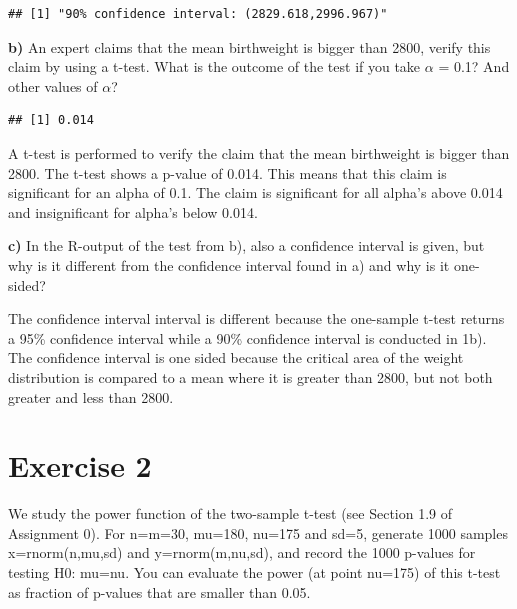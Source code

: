 \documentclass[
]{article}
\newenvironment{Shaded}{\begin{snugshade}}{\end{snugshade}}
\newcommand{\AttributeTok}[1]{\textcolor[rgb]{0.77,0.63,0.00}{#1}}
\newcommand{\DecValTok}[1]{\textcolor[rgb]{0.00,0.00,0.81}{#1}}
\newcommand{\FloatTok}[1]{\textcolor[rgb]{0.00,0.00,0.81}{#1}}
\newcommand{\FunctionTok}[1]{\textcolor[rgb]{0.00,0.00,0.00}{#1}}
\newcommand{\NormalTok}[1]{#1}
\newcommand{\SpecialCharTok}[1]{\textcolor[rgb]{0.00,0.00,0.00}{#1}}
\newcommand{\StringTok}[1]{\textcolor[rgb]{0.31,0.60,0.02}{#1}}
\begin{document}
\begin{verbatim}
## [1] "90% confidence interval: (2829.618,2996.967)"
\end{verbatim}

\textbf{b)} An expert claims that the mean birthweight is bigger than
2800, verify this claim by using a t-test. What is the outcome of the
test if you take \(\alpha\) = 0.1? And other values of \(\alpha\)?

\begin{Shaded}
\end{Shaded}

\begin{verbatim}
## [1] 0.014
\end{verbatim}

A t-test is performed to verify the claim that the mean birthweight is
bigger than 2800. The t-test shows a p-value of 0.014. This means that
this claim is significant for an alpha of 0.1. The claim is significant
for all alpha's above 0.014 and insignificant for alpha's below 0.014.

\textbf{c)} In the R-output of the test from b), also a confidence
interval is given, but why is it different from the confidence interval
found in a) and why is it one-sided?

The confidence interval interval is different because the one-sample
t-test returns a 95\% confidence interval while a 90\% confidence
interval is conducted in 1b). The confidence interval is one sided
because the critical area of the weight distribution is compared to a
mean where it is greater than 2800, but not both greater and less than
2800.

\hypertarget{exercise-2}{%
\section{Exercise 2}\label{exercise-2}}

We study the power function of the two-sample t-test (see Section 1.9 of
Assignment 0). For n=m=30, mu=180, nu=175 and sd=5, generate 1000
samples x=rnorm(n,mu,sd) and y=rnorm(m,nu,sd), and record the 1000
p-values for testing H0: mu=nu. You can evaluate the power (at point
nu=175) of this t-test as fraction of p-values that are smaller than
0.05.
\end{document}
